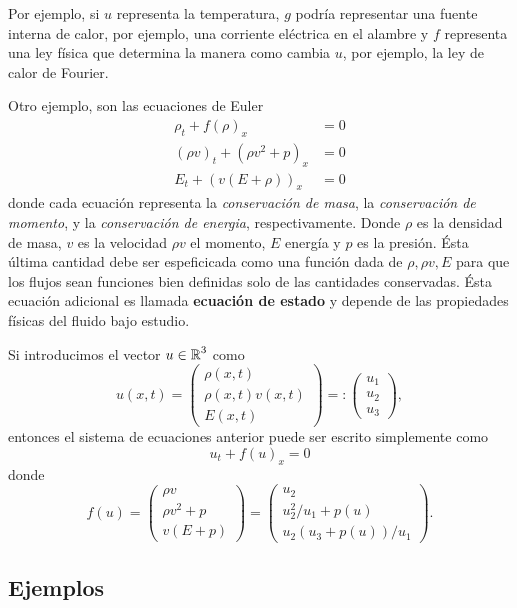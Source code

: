 Por ejemplo, si $u$ representa la temperatura, $g$ podría representar una fuente interna de calor, por ejemplo, una corriente eléctrica en el alambre y $f$ representa una ley física que determina la manera como cambia $u$, por ejemplo, la ley de calor de Fourier.

Otro ejemplo, son las ecuaciones de Euler
\begin{align*}
\rho_t + f(\rho)_x &=0 \\
(\rho v)_t + (\rho v^2 + p)_x &= 0 \\
E_t + (v(E+\rho))_x &= 0
\end{align*}
donde cada ecuación representa la \textit{conservación de masa}, la \textit{conservación de momento}, y la \textit{conservación de energia}, respectivamente. Donde $\rho$ es la densidad de masa, $v$ es la velocidad $\rho v$ el momento, $E$ energía y $p$ es la presión. Ésta última cantidad debe ser espeficicada como una función dada de $\rho, \rho v, E$ para que los flujos sean funciones bien definidas solo de las cantidades conservadas. Ésta ecuación adicional es llamada \textbf{ecuación de estado} y depende de las propiedades físicas del fluido bajo estudio.

Si introducimos el vector $u \in \operatorname{\mathbb R}^3$ como
\[
u(x,t) = \begin{pmatrix}
		 \rho(x,t)	\\
		 \rho(x,t) v(x,t) \\
		 E(x,t)
		 \end{pmatrix}
		 =:
		 \begin{pmatrix}
		 u_1		\\
		 u_2		\\
		 u_3
		 \end{pmatrix},
\]
entonces el sistema de ecuaciones anterior puede ser escrito simplemente como
\[
u_t + f(u)_x = 0
\]
donde
\[
f(u) = \begin{pmatrix}
	   \rho v	\\
	   \rho v^2 + p	\\
	   v(E + p)
	   \end{pmatrix}
	   =
	   \begin{pmatrix}
	   u_2	\\
	   u_2^2/u_1 + p(u)	\\
	   u_2(u_3 + p(u))/u_1
	   \end{pmatrix}.
\]

\subsection{Ejemplos}
